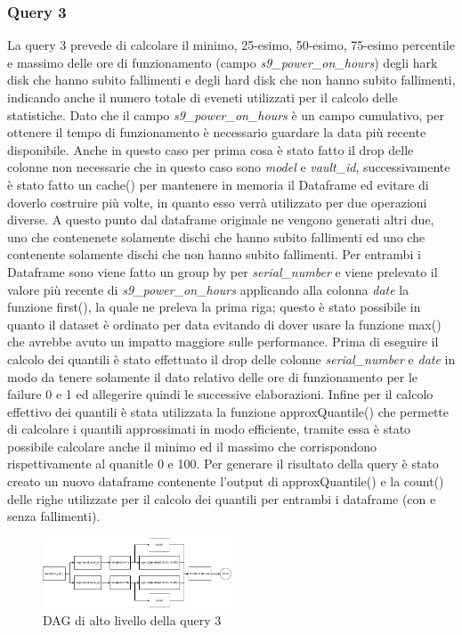 \documentclass[conference]{IEEEtran}
\begin{document}
\subsubsection{Query 3}
La query 3 prevede di calcolare il minimo, 25-esimo, 50-esimo, 75-esimo percentile e massimo delle ore di funzionamento (campo \textit{s9\_power\_on\_hours}) degli hark disk che hanno subito fallimenti e degli hard disk che non hanno subito fallimenti, indicando anche il numero totale di eveneti utilizzati per il calcolo delle statistiche.
Dato che il campo \textit{s9\_power\_on\_hours} è un campo cumulativo, per ottenere il tempo di funzionamento è necessario guardare la data più recente disponibile.
Anche in questo caso per prima cosa è stato fatto il drop delle colonne non necessarie che in questo caso sono \textit{model} e \textit{vault\_id}, successivamente è stato fatto un cache() per mantenere in memoria il Dataframe ed evitare di doverlo costruire più volte, in quanto esso verrà utilizzato per due operazioni diverse. A questo punto dal dataframe originale ne vengono generati altri due, uno che contenenete solamente dischi che hanno subito fallimenti ed uno che contenente solamente dischi che non hanno subito fallimenti. Per entrambi i Dataframe sono viene fatto un group by per \textit{serial\_number} e viene prelevato il valore più recente di \textit{s9\_power\_on\_hours} applicando alla colonna \textit{date} la funzione first(), la quale ne preleva la prima riga; questo è stato possibile in quanto il dataset è ordinato per data evitando di dover usare la funzione max() che avrebbe avuto un impatto maggiore sulle performance. Prima di eseguire il calcolo dei quantili è stato effettuato il drop delle colonne \textit{serial\_number} e \textit{date} in modo da tenere solamente il dato relativo delle ore di funzionamento per le failure 0 e 1 ed allegerire quindi le successive elaborazioni. Infine per il calcolo effettivo dei quantili è stata utilizzata la funzione approxQuantile() che permette di calcolare i quantili approssimati in modo efficiente, tramite essa è stato possibile calcolare anche il minimo ed il massimo che corrispondono rispettivamente al quanitle 0 e 100. Per generare il risultato della query è stato creato un nuovo dataframe contenente l'output di approxQuantile() e la count() delle righe utilizzate per il calcolo dei quantili per entrambi i dataframe (con e senza fallimenti).
\begin{figure}[H]
    \centerline{\includegraphics[width=0.5\textwidth]{res/query3_dag.png}}
    \caption{DAG di alto livello della query 3}
    \label{fig:dag_query3}
\end{figure}
\end{document}
